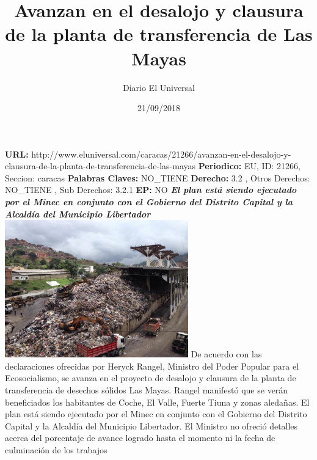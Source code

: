 \documentclass{article}%
\title{\textbf{Avanzan en el desalojo y clausura de la planta de transferencia de Las Mayas}}%
\author{Diario El Universal}%
\date{21/09/2018}%
\begin{document}
%
\normalsize%
\maketitle%
\textbf{URL: }%
http://www.eluniversal.com/caracas/21266/avanzan{-}en{-}el{-}desalojo{-}y{-}clausura{-}de{-}la{-}planta{-}de{-}transferencia{-}de{-}las{-}mayas\newline%
%
\textbf{Periodico: }%
EU, %
ID: %
21266, %
Seccion: %
caracas\newline%
%
\textbf{Palabras Claves: }%
NO\_TIENE\newline%
%
\textbf{Derecho: }%
3.2%
, Otros Derechos: %
NO\_TIENE%
, Sub Derechos: %
3.2.1%
\newline%
%
\textbf{EP: }%
NO\newline%
\newline%
%
\textbf{\textit{El plan está siendo ejecutado por el Minec en conjunto con el Gobierno del Distrito Capital y la Alcaldía del Municipio Libertador}}%
\newline%
\newline%
%
\includegraphics[width=300px]{129.jpg}%
\newline%
%
De acuerdo con las declaraciones ofrecidas por Heryck Rangel, Ministro del Poder Popular para el Ecosocialismo, se avanza en el proyecto de desalojo y clausura de la planta de transferencia de desechos sólidos Las Mayas.%
\newline%
%
Rangel manifestó que se verán beneficiados los habitantes de Coche, El Valle, Fuerte Tiuna y zonas aledañas.%
\newline%
%
El plan está siendo ejecutado por el Minec en conjunto con el Gobierno del Distrito Capital y la Alcaldía del Municipio Libertador.%
\newline%
%
El Ministro no ofreció detalles acerca del porcentaje de avance logrado hasta el momento ni la fecha de culminación de los trabajos%
\newline%
%
\end{document}
